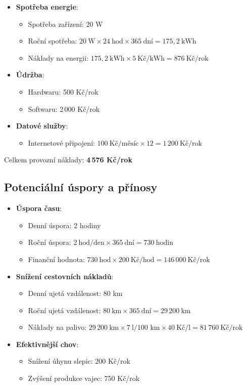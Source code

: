 \begin{itemize}
    \item \textbf{Spotřeba energie}:
    \begin{itemize}
        \item Spotřeba zařízení: 20 W
        \item Roční spotřeba: \(20~\text{W} \times 24~\text{hod} \times 365~\text{dní} = 175{,}2~\text{kWh}\)
        \item Náklady na energii: \(175{,}2~\text{kWh} \times 5~\text{Kč/kWh} = 876~\text{Kč/rok}\)
    \end{itemize}
    \item \textbf{Údržba}:
    \begin{itemize}
        \item Hardwaru: 500 Kč/rok
        \item Softwaru: 2\,000 Kč/rok
    \end{itemize}
    \item \textbf{Datové služby}:
    \begin{itemize}
        \item Internetové připojení: \(100~\text{Kč/měsíc} \times 12 = 1\,200~\text{Kč/rok}\)
    \end{itemize}
\end{itemize}

Celkem provozní náklady: \textbf{4\,576 Kč/rok}

\subsection*{Potenciální úspory a přínosy}

\begin{itemize}
    \item \textbf{Úspora času}:
    \begin{itemize}
        \item Denní úspora: 2 hodiny
        \item Roční úspora: \(2~\text{hod/den} \times 365~\text{dní} = 730~\text{hodin}\)
        \item Finanční hodnota: \(730~\text{hod} \times 200~\text{Kč/hod} = 146\,000~\text{Kč/rok}\)
    \end{itemize}
    \item \textbf{Snížení cestovních nákladů}:
    \begin{itemize}
        \item Denní ujetá vzdálenost: 80 km
        \item Roční ujetá vzdálenost: \(80~\text{km} \times 365~\text{dní} = 29\,200~\text{km}\)
        \item Náklady na palivo: \(29\,200~\text{km} \times 7~\text{l/100 km} \times 40~\text{Kč/l} = 81\,760~\text{Kč/rok}\)
    \end{itemize}
    \item \textbf{Efektivnější chov}:
    \begin{itemize}
        \item Snížení úhynu slepic: 200 Kč/rok
        \item Zvýšení produkce vajec: 750 Kč/rok
    \end{itemize}
\end{itemize}

